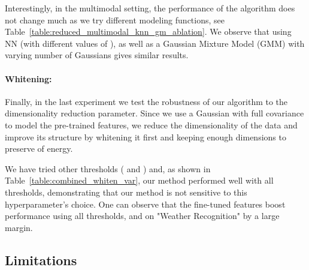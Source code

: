 \documentclass[10pt,twocolumn,letterpaper]{article}
\begin{document}
Interestingly, in the multimodal setting, the performance of the algorithm does not change much as we try different modeling functions, see Table~\ref{table:reduced_multimodal_knn_gm_ablation}. We observe that using NN (with different values of ), as well as a Gaussian Mixture Model (GMM) with varying number of Gaussians gives similar results. 





























\paragraph{Whitening:} Finally, in the last experiment we test the robustness of our algorithm to the dimensionality reduction parameter. Since we use a Gaussian with full covariance to model the pre-trained features, we reduce the dimensionality of the data and improve its structure by whitening it first and keeping enough dimensions to preserve  of energy.

We have tried other thresholds ( and ) and, as shown in Table~\ref{table:combined_whiten_var}, our method performed well with all thresholds, demonstrating that our method is not sensitive to this hyperparameter's choice. One can observe that the fine-tuned features boost performance using all thresholds, and on "Weather Recognition" by a large margin.






\subsection{Limitations}
\label{limitations.}
\end{document}
